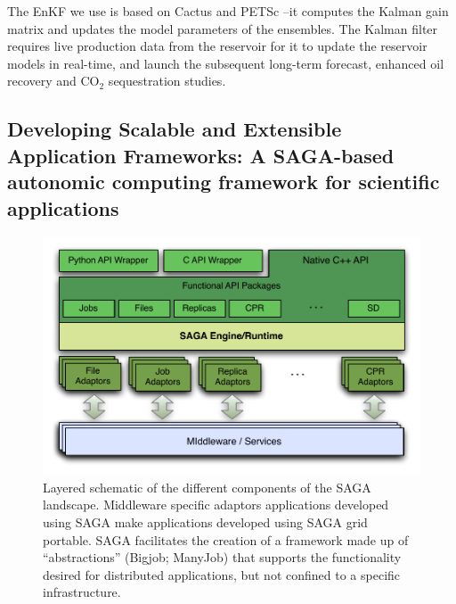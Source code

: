 \documentclass{acm_proc_article-sp}
\begin{document}
The EnKF we use is based on Cactus and PETSc --it computes the Kalman
gain matrix and updates the model parameters of the ensembles. The
Kalman filter requires live production data from the reservoir for it
to update the reservoir models in real-time, and launch the subsequent
long-term forecast, enhanced oil recovery and CO$_2$ sequestration
studies.

\subsection{Developing Scalable and Extensible Application
  Frameworks: A SAGA-based autonomic computing framework for
  scientific applications}

\begin{figure}[!ht]
\begin{center}
     \includegraphics[scale=0.53]{stci-saga-figures-1.pdf}
\end{center}
 \caption{\small Layered schematic of the different components
    of the SAGA landscape.  Middleware specific adaptors applications
    developed using SAGA make applications developed using SAGA grid
    portable. SAGA facilitates the
    creation of a framework made up of ``abstractions'' (Bigjob;
    ManyJob) that supports the functionality desired for distributed
    applications, but not confined to a specific infrastructure.}
 \label{sagalayer}
\end{figure}
\end{document}
